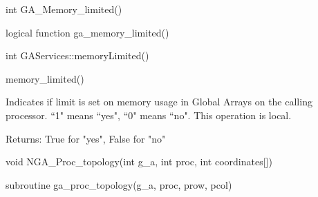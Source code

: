 \documentclass[12pt]{article}
\begin{document}

\begin{capi}
\begin{ccode}
int GA_Memory_limited()
\end{ccode}
\end{capi}

\begin{fapi}
\begin{fcode}
logical function ga_memory_limited()
\end{fcode}
\end{fapi}

\begin{cxxapi}
\begin{cxxcode}
int GAServices::memoryLimited()
\end{cxxcode}
\end{cxxapi}

\begin{pyapi}
\begin{pycode}
memory_limited() 
\end{pycode}
\end{pyapi}

\begin{desc}

Indicates if limit is set on memory usage in Global Arrays on the calling processor. 
``1" means ``yes", ``0" means ``no".
This operation is local.

Returns: 
True for "yes", False for "no"
\end{desc}


\begin{capi}
\begin{ccode}
void NGA_Proc_topology(int g_a, int proc, int coordinates[])
\end{ccode}
\begin{funcargs}
\end{funcargs}
\end{capi}

\begin{fapi}
\begin{fcode}
subroutine ga_proc_topology(g_a, proc, prow, pcol)
\end{fcode}
\begin{funcargs}
\end{funcargs}
\end{fapi}
\end{document}
